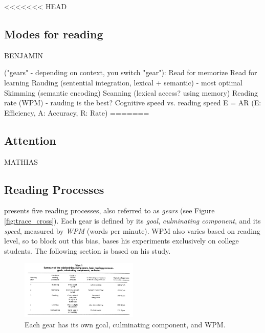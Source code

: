<<<<<<< HEAD
\subsection{Modes for reading}
BENJAMIN

("gears" - depending on context, you switch "gear"):
Read for memorize
Read for learning
Rauding (sentential integration, lexical + semantic) - most optimal
Skimming (semantic encoding)
Scanning (lexical access? using memory)
Reading rate (WPM) - rauding is the best?
Cognitive speed vs. reading speed
E = AR (E: Efficiency, A: Accuracy, R: Rate)
=======
\subsection{Attention}
MATHIAS

\subsection{Reading Processes}
 presents five reading processes, also referred to as \textit{gears} (see Figure \ref{fig:trace_cross}). Each gear is defined by its \textit{goal}, \textit{culminating component}, and its \textit{speed}, measured by \textit{WPM} (words per minute). WPM also varies based on reading level, so to block out this bias, \citeauthor{carver_reading_1992} bases his experiments exclusively on college students. The following section is based on his study.

\begin{figure}[htbp]
\centering
\includegraphics[width=0.5\textwidth]{Pics/gears_list}
\caption{Each gear has its own goal, culminating component, and WPM.}
\label{fig:gears_list}
\end{figure}

